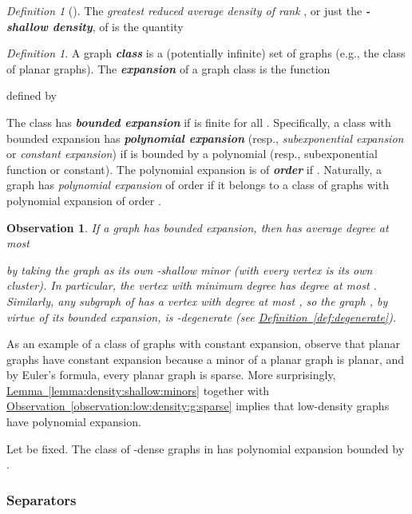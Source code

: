 \documentclass[12pt]{article}
\newcommand{\emphic}[2]{\textcolor{blue25}{\textbf{\emph{#1}}}\index{#2}}
\renewcommand{\emphic}[2]{\textbf{\emph{#1}}}
\newcommand{\emphi}[1]{\emphic{#1}{#1}}
\newtheorem{observation}[theorem]{Observation}
\theoremstyle{remark}\theoremheaderfont{\sf}\theorembodyfont{\upshape}
\newtheorem{defn}[theorem]{Definition}
\numberwithin{figure}{section}\numberwithin{table}{section}\numberwithin{equation}{section}
\newcommand{\HLink}[2]{\hyperref[#2]{#1~\ref*{#2}}}
\providecommand{\deflab}[1]{\label{def:#1}}
\newcommand{\defref}[1]{\HLink{Definition}{def:#1}}
\newcommand{\lemref}[1]{\HLink{Lemma}{lemma:#1}}
\newcommand{\obslab}[1]{\label{observation:#1}}
\newcommand{\obsref}[1]{\HLink{Observation}{observation:#1}}
\begin{document}
\begin{defn}[{\cite{no-gcbe1-08}}]
  \deflab{r:shallow:density}The \emph{greatest reduced average density of rank }, or just the
  \emphi{-shallow density}, of  is the quantity
   \end{defn}


\begin{defn}
  \deflab{expansion}A graph \emphi{class} is a (potentially infinite) set of graphs
  (e.g., the class of planar graphs).  The \emphi{expansion} of a
  graph class  is the function
  
  defined
  by
  
  The class  has \emphi{bounded expansion} if  is finite
  for all . Specifically, a class  with bounded expansion
  has \emphi{polynomial expansion} (resp., \emph{subexponential
    expansion} or \emph{constant expansion}) if  is bounded by a
  polynomial (resp., subexponential function or constant).  The
  polynomial expansion is of \emphi{order } if .
  Naturally, a graph  has \emph{polynomial expansion} of order
   if it belongs to a class of graphs with {polynomial expansion}
  of order .
\end{defn}

\begin{observation}
  \obslab{bounded:expansion:degenerate}If a graph  has bounded expansion, then  has average
  degree at most
  
  by taking the graph  as its own -shallow minor (with
  every vertex is its own cluster). In particular, the vertex 
  with minimum degree has degree at most . Similarly, any
  subgraph of  has a vertex  with degree at most ,
  so the graph , by virtue of its bounded expansion, is
  -degenerate (see \defref{degenerate}).
\end{observation}

As an example of a class of graphs with constant expansion, observe
that planar graphs have constant expansion because a minor of a planar
graph is planar, and by Euler's formula, every planar graph is
sparse. More surprisingly, \lemref{density:shallow:minors} together
with \obsref{low:density:g:sparse} implies that low-density graphs
have polynomial expansion.

\begin{lemma}
  Let  be fixed.  The class of -dense graphs
  in  has polynomial expansion bounded by
  .
\end{lemma}

\subsubsection{Separators}
\end{document}
